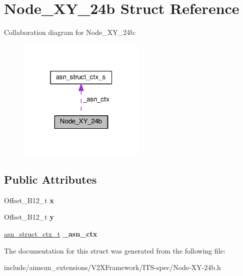 \hypertarget{structNode__XY__24b}{}\section{Node\+\_\+\+X\+Y\+\_\+24b Struct Reference}
\label{structNode__XY__24b}


Collaboration diagram for Node\+\_\+\+X\+Y\+\_\+24b\+:\nopagebreak
\begin{figure}[H]
\begin{center}
\leavevmode
\includegraphics[width=172pt]{structNode__XY__24b__coll__graph}
\end{center}
\end{figure}
\subsection*{Public Attributes}
\begin{DoxyCompactItemize}
\item 
Offset\+\_\+\+B12\+\_\+t {\bfseries x}\hypertarget{structNode__XY__24b_a1707b6a5abef49468272445f803708a7}{}\label{structNode__XY__24b_a1707b6a5abef49468272445f803708a7}

\item 
Offset\+\_\+\+B12\+\_\+t {\bfseries y}\hypertarget{structNode__XY__24b_a2a194ad554418ed9f2d68cd161a700d4}{}\label{structNode__XY__24b_a2a194ad554418ed9f2d68cd161a700d4}

\item 
\hyperlink{structasn__struct__ctx__s}{asn\+\_\+struct\+\_\+ctx\+\_\+t} {\bfseries \+\_\+asn\+\_\+ctx}\hypertarget{structNode__XY__24b_a265100184b5c673493f540304ca743ac}{}\label{structNode__XY__24b_a265100184b5c673493f540304ca743ac}

\end{DoxyCompactItemize}


The documentation for this struct was generated from the following file\+:\begin{DoxyCompactItemize}
\item 
include/aimsun\+\_\+extensions/\+V2\+X\+Framework/\+I\+T\+S-\/spec/Node-\/\+X\+Y-\/24b.\+h\end{DoxyCompactItemize}
